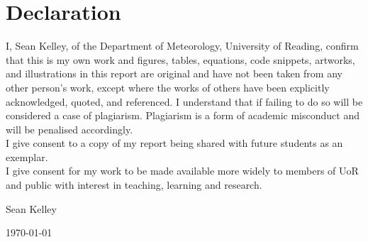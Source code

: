 \documentclass[a4paper,11pt,oneside]{book}
\begin{document}
    \chapter*{\Large Declaration}
    I, Sean Kelley, of the Department of Meteorology, University of Reading, confirm that this is my own work and figures, tables, equations, code snippets, artworks, and illustrations in this report are original and have not been taken from any other person's work, except where the works of others have been explicitly acknowledged, quoted, and referenced. I understand that if failing to do so will be considered a case of plagiarism. Plagiarism is a form of academic misconduct and will be penalised accordingly. \\

    \noindent
    I give consent to a copy of my report being shared with future students as an exemplar. \\
    
    \noindent
    I give consent for my work to be made available more widely to members of UoR and public with interest in teaching, learning and research.
    ~\\[1cm]
    \begin{flushright}
	Sean Kelley
    
    \today
    \end{flushright}
    
    
   
       
    
    \tableofcontents
    \listoffigures
    \listoftables
    

    \mainmatter
    
    
    
    
    
    
    

    
    
    \begin{appendices}
        
    \end{appendices}
    
\end{document}
